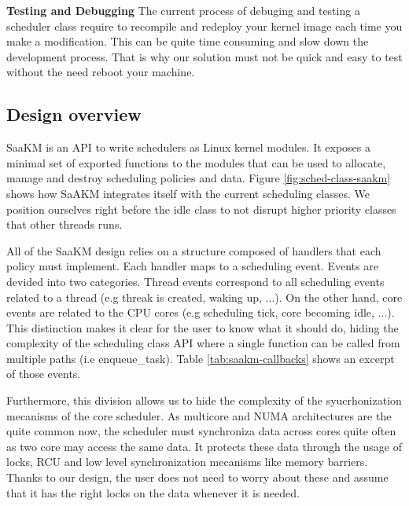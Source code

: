 \textbf{Testing and Debugging} The current process of debuging and testing a scheduler class require to recompile and redeploy your kernel image each time you make a modification. This can be quite time consuming and slow down the development process. That is why our solution must not be quick and easy to test without the need reboot your machine.\newline
\subsection{Design overview}
\par SaaKM is an API to write schedulers as Linux kernel modules. It exposes a minimal set of exported functions to the modules that can be used to allocate, manage and destroy scheduling policies and data. Figure \ref{fig:sched-class-saakm} shows how SaAKM integrates itself with the current scheduling classes. We position ourselves right before the idle class to not disrupt higher priority classes that other threads runs.\newline

\par All of the SaaKM design relies on a structure composed of handlers that each policy must implement. Each handler maps to a scheduling event. Events are devided into two categories. Thread events correspond to all scheduling events related to a thread (e.g threak is created, waking up, ...). On the other hand, core events are related to the CPU cores (e.g scheduling tick, core becoming idle, ...). This distinction makes it clear for the user to know what it should do, hiding the complexity of the scheduling class API where a single function can be called from multiple paths (i.e enqueue\_task). Table \ref{tab:saakm-callbacks} shows an excerpt of those events.\newline

\par Furthermore, this division allows us to hide the complexity of the syucrhonization mecanisms of the core scheduler. As multicore and NUMA architectures are the quite common now, the scheduler must synchroniza data across cores quite often as two core may access the same data. It protects these data through the usage of locks, RCU and low level synchronization mecanisms like memory barriers. Thanks to our design, the user does not need to worry about these and assume that it has the right locks on the data whenever it is needed. \newline

